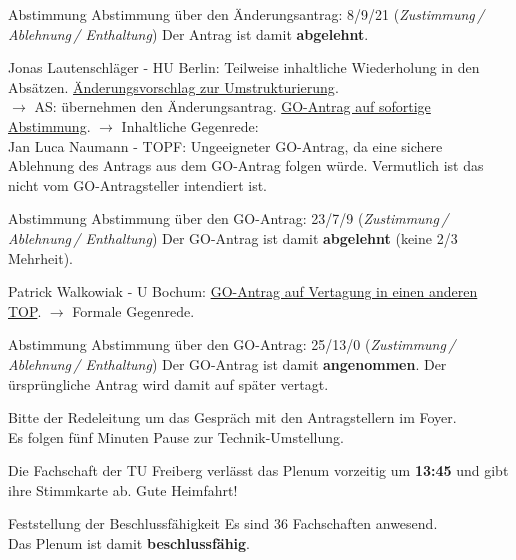     \begin{danger}{Abstimmung}
      Abstimmung über den Änderungsantrag: 8/9/21 (\textit{Zustimmung\,/ Ablehnung\,/ Enthaltung})
      Der Antrag ist damit \textbf{abgelehnt}.
    \end{danger}

    \begin{outline}
      \1 Jonas Lautenschläger - HU Berlin:  Teilweise inhaltliche Wiederholung in den Absätzen. \uline{Änderungsvorschlag zur Umstrukturierung}. \\
      $\rightarrow$ AS: übernehmen den Änderungsantrag.
      \1 \uline{GO-Antrag auf sofortige Abstimmung}. $\rightarrow$ Inhaltliche Gegenrede: \\
        Jan Luca Naumann - TOPF:  Ungeeigneter GO-Antrag, da eine sichere Ablehnung des Antrags aus dem GO-Antrag folgen würde. Vermutlich ist das nicht vom GO-Antragsteller intendiert ist.
    \end{outline}

    \begin{danger}{Abstimmung}
      Abstimmung über den GO-Antrag: 23/7/9 (\textit{Zustimmung\,/ Ablehnung\,/ Enthaltung})
      Der GO-Antrag ist damit \textbf{abgelehnt} (keine 2/3 Mehrheit).
    \end{danger}

    \begin{outline}
      \1 Patrick Walkowiak - U Bochum:  \uline{GO-Antrag auf Vertagung in einen anderen TOP}. $\rightarrow$ Formale Gegenrede.
    \end{outline}

    \begin{success}{Abstimmung}
      Abstimmung über den GO-Antrag: 25/13/0 (\textit{Zustimmung\,/ Ablehnung\,/ Enthaltung})
      Der GO-Antrag ist damit \textbf{angenommen}. Der ürsprüngliche Antrag wird damit auf später vertagt.
    \end{success}

    Bitte der Redeleitung um das Gespräch mit den Antragstellern im Foyer. \\
    Es folgen fünf Minuten Pause zur Technik-Umstellung.

    \begin{info}{}
      Die Fachschaft der TU Freiberg verlässt das Plenum vorzeitig um \textbf{13:45} und gibt ihre Stimmkarte ab. Gute Heimfahrt!
    \end{info}

    \begin{success}{Feststellung der Beschlussfähigkeit}
      Es sind 36 Fachschaften anwesend. \\
      Das Plenum ist damit \textbf{beschlussfähig}.
    \end{success}


